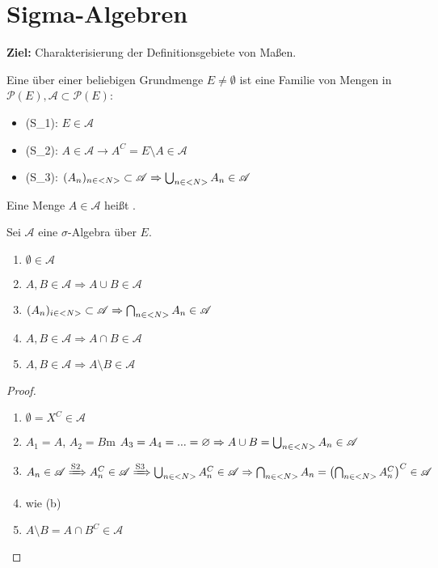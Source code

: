 \section{Sigma-Algebren}

\textbf{Ziel:} Charakterisierung der Definitionsgebiete von Maßen.

\begin{definition}
	Eine  über einer beliebigen Grundmenge $E \neq \emptyset$ ist eine Familie von Mengen in $\mathscr{P}(E), \mathscr{A} \subset \mathscr{P}(E)$:
	\begin{itemize}
		\item (S_1): $E \in \mathscr{A}$
		\item (S_2): $A \in \mathscr{A} \to A^C = E \setminus A \in \mathscr{A}$
		\item (S_3): $(A_n)_{n\in <N>} \subset \mathscr{A} \Rightarrow \bigcup_{n\in <N>}A_n \in \mathscr{A}$
	\end{itemize}
	Eine Menge $A\in\mathscr{A}$ heißt .
\end{definition}

\begin{proposition}
	Sei $\mathscr{A}$ eine $\sigma$-Algebra über $E$.
	\begin{enumerate}[label=(\alph*)]
		\item $\emptyset\in\mathscr{A}$
		\item $A,B\in\mathscr{A}\Rightarrow A\cup B\in\mathscr{A}$
		\item $(A_n)_{i\in<N>}\subset\mathscr{A}\Rightarrow\bigcap_{n\in <N>}A_n\in\mathscr{A}$
		\item $A,B\in\mathscr{A}\Rightarrow A\cap B\in\mathscr{A}$
		\item $A,B\in\mathscr{A}\Rightarrow A\setminus B\in\mathscr{A}$
	\end{enumerate}
\end{proposition}
\begin{proof}
	\begin{enumerate}[label=(\alph*)]
		\item $\emptyset=X^C\in\mathscr{A}$
		\item $A_1=A$, $A_2=B$m $A_3=A_4=...=\varnothing\Rightarrow A\cup B=\bigcup_{n\in <N>} A_n\in\mathscr{A}$
		\item $A_n\in\mathscr{A}\xRightarrow{\text{S2}}A_n^C\in\mathscr{A}\xRightarrow{\text{S3}}\bigcup_{n\in <N>} A_n^C\in\mathscr{A}\Rightarrow\bigcap_{n\in <N>}A_n=\left(\bigcap_{n\in <N>} A_n^C\right)^C\in\mathscr{A}$
		\item wie (b)
		\item $A\setminus B=A\cap B^C\in\mathscr{A}$
	\end{enumerate}
\end{proof}


